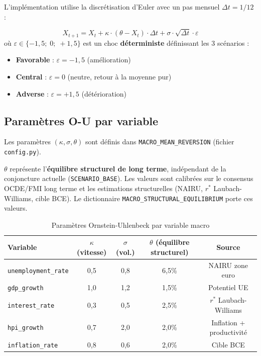 \documentclass[12pt,a4paper]{article}
\begin{document}
L'impl\'ementation utilise la discr\'etisation d'Euler avec un pas mensuel
$\Delta t = 1/12$ :

\begin{formulebox}
\begin{equation}
    X_{t+1} = X_t + \kappa \cdot (\theta - X_t) \cdot \Delta t
    + \sigma \cdot \sqrt{\Delta t} \cdot \varepsilon
    \label{eq:ou_discrete}
\end{equation}
o\`u $\varepsilon \in \{-1{,}5 ;\; 0 ;\; +1{,}5\}$ est un choc \textbf{d\'eterministe}
d\'efinissant les 3 sc\'enarios :
\begin{itemize}[nosep]
    \item \textbf{Favorable} : $\varepsilon = -1{,}5$ (am\'elioration)
    \item \textbf{Central} : $\varepsilon = 0$ (neutre, retour \`a la moyenne pur)
    \item \textbf{Adverse} : $\varepsilon = +1{,}5$ (d\'et\'erioration)
\end{itemize}
\end{formulebox}

\subsection{Param\`etres O-U par variable}

Les param\`etres $(\kappa, \sigma, \theta)$ sont d\'efinis dans
\texttt{MACRO\_MEAN\_REVERSION} (fichier \texttt{config.py}).

\begin{warningbox}
$\theta$ repr\'esente l'\textbf{\'equilibre structurel de long terme}, ind\'ependant de la
conjoncture actuelle (\texttt{SCENARIO\_BASE}). Les valeurs sont calibr\'ees sur le consensus
OCDE/FMI long terme et les estimations structurelles (NAIRU, $r^*$ Laubach-Williams,
cible BCE). Le dictionnaire \texttt{MACRO\_STRUCTURAL\_EQUILIBRIUM} porte ces valeurs.
\end{warningbox}

\begin{table}[htbp]
\centering
\caption{Param\`etres Ornstein-Uhlenbeck par variable macro}
\begin{tabular}{lcccc}
\toprule
\textbf{Variable} & $\kappa$ (vitesse) & $\sigma$ (vol.) & $\theta$ (\'equilibre structurel) & Source \\
\midrule
\texttt{unemployment\_rate} & 0,5 & 0,8 & 6,5\% & NAIRU zone euro \\
\texttt{gdp\_growth} & 1,0 & 1,2 & 1,5\% & Potentiel UE \\
\texttt{interest\_rate} & 0,3 & 0,5 & 2,5\% & $r^*$ Laubach-Williams \\
\texttt{hpi\_growth} & 0,7 & 2,0 & 2,0\% & Inflation + productivit\'e \\
\texttt{inflation\_rate} & 0,8 & 0,6 & 2,0\% & Cible BCE \\
\bottomrule
\end{tabular}
\label{tab:ou_params}
\end{table}
\end{document}
